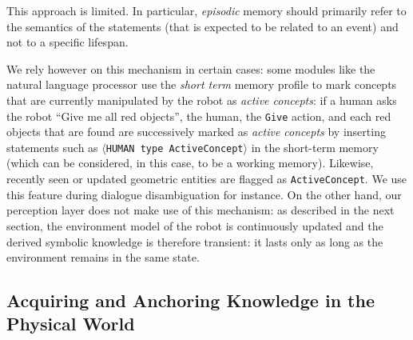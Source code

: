 \documentclass[preprint,3p,times]{elsarticle}
\newcommand{\concept}[1]{{\small \texttt{#1}}}
\newcommand{\stmt}[1]{{\footnotesize\tt$\langle$#1\relax$\rangle$}}
\begin{document}
This approach is limited. In particular, \emph{episodic} memory should primarily
refer to the semantics of the statements (that is expected to be related to an
event) and not to a specific lifespan.

We rely however on this mechanism in certain cases: some modules
like the natural language processor use the {\it short term} memory profile to
mark concepts that are currently manipulated by the
robot as \emph{active concepts}: if a human asks the robot ``Give
me all red objects'', the human, the \concept{Give} action, and each red
objects that are found are successively marked as \emph{active concepts} by
inserting statements such as \stmt{HUMAN type ActiveConcept} in the short-term
memory (which can be considered, in this case, to be a working memory).
Likewise, recently seen or updated geometric entities are flagged as
\concept{ActiveConcept}. We use this feature during dialogue disambiguation for
instance. On the other hand, our perception layer does not make use of this
mechanism: as described in the next section, the environment model of the robot
is continuously updated and the derived symbolic knowledge is therefore
transient: it lasts only as long as the environment remains in the same state.


\subsection{Acquiring and Anchoring Knowledge in the Physical World}
\label{sect|sit-ass}
\end{document}
